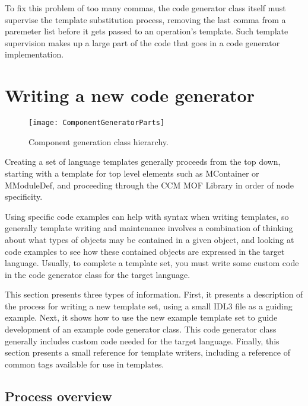 To fix this problem of too many commas, the code generator class itself must
supervise the template substitution process, removing the last comma from a
paremeter list before it gets passed to an operation's template. Such template
supervision makes up a large part of the code that goes in a code generator
implementation.

\section{Writing a new code generator}

\begin{figure}
\centering
\texttt{[image: ComponentGeneratorParts]}
\caption{Component generation class hierarchy.}
\label{fig:component-generator-parts}
\end{figure}

Creating a set of language templates generally proceeds from the top down,
starting with a template for top level elements such as MContainer or
MModuleDef, and proceeding through the CCM MOF Library in order of node
specificity.

Using specific code examples can help with syntax when writing templates, so
generally template writing and maintenance involves a combination of thinking
about what types of objects may be contained in a given object, and looking at
code examples to see how these contained objects are expressed in the target
language. Usually, to complete a template set, you must write some custom code
in the code generator class for the target language.

This section presents three types of information. First, it presents a
description of the process for writing a new template set, using a small IDL3
file as a guiding example. Next, it shows how to use the new example template
set to guide development of an example code generator class. This code generator
class generally includes custom code needed for the target language. Finally,
this section presents a small reference for template writers, including a
reference of common tags available for use in templates.

\subsection{Process overview}

